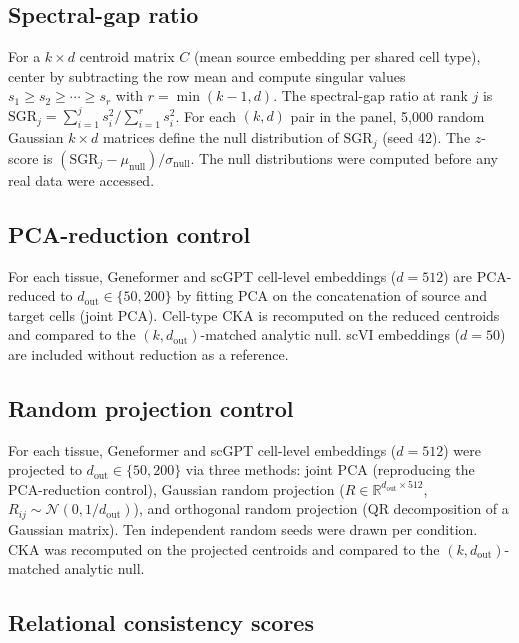 \documentclass[11pt]{article}
\newcommand{\R}{\mathbb{R}}
\begin{document}
\subsection{Spectral-gap ratio}
\label{sec:sgrmethod}

For a $k \times d$ centroid matrix $C$ (mean source embedding per
shared cell type), center by subtracting the row mean and compute
singular values $s_1 \geq s_2 \geq \cdots \geq s_r$ with $r =
\min(k{-}1, d)$. The spectral-gap ratio at rank $j$ is $\mathrm{SGR}_j
= \sum_{i=1}^j s_i^2 / \sum_{i=1}^r s_i^2$. For each $(k, d)$ pair in
the panel, 5,000 random Gaussian $k \times d$ matrices define the null
distribution of $\mathrm{SGR}_j$ (seed 42). The $z$-score is
$({\mathrm{SGR}_j - \mu_{\mathrm{null}}}) / {\sigma_{\mathrm{null}}}$.
The null distributions were computed before any real data were
accessed.

\subsection{PCA-reduction control}

For each tissue, Geneformer and scGPT cell-level embeddings ($d = 512$)
are PCA-reduced to $d_{\mathrm{out}} \in \{50, 200\}$ by fitting PCA on
the concatenation of source and target cells (joint PCA). Cell-type CKA
is recomputed on the reduced centroids and compared to the
$(k, d_{\mathrm{out}})$-matched analytic null. scVI embeddings
($d = 50$) are included without reduction as a reference.

\subsection{Random projection control}
\label{sec:randprojmethod}

For each tissue, Geneformer and scGPT cell-level embeddings ($d = 512$)
were projected to $d_{\mathrm{out}} \in \{50, 200\}$ via three methods:
joint PCA (reproducing the PCA-reduction control), Gaussian random
projection ($R \in \R^{d_{\mathrm{out}} \times 512}$,
$R_{ij} \sim \mathcal{N}(0, 1/d_{\mathrm{out}})$), and orthogonal
random projection (QR decomposition of a Gaussian matrix). Ten
independent random seeds were drawn per condition. CKA was recomputed on
the projected centroids and compared to the
$(k, d_{\mathrm{out}})$-matched analytic null.

\subsection{Relational consistency scores}
\label{sec:scgraphmethod}
\end{document}
